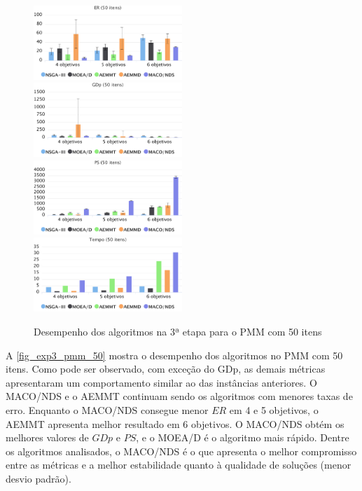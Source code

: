 \begin{figure}[!htbp]
	\includegraphics[width=0.5\textwidth]{cap_experimentos/figs/etapa3/er-mkp-50}
	\includegraphics[width=0.5\textwidth]{cap_experimentos/figs/etapa3/gd-mkp-50}
	\includegraphics[width=0.5\textwidth]{cap_experimentos/figs/etapa3/ps-mkp-50}
	\includegraphics[width=0.5\textwidth]{cap_experimentos/figs/etapa3/time-mkp-50}
	\caption{\label{fig_exp3_pmm_50}Desempenho dos algoritmos na 3ª etapa para o PMM com 50 itens}
\end{figure}

A \autoref{fig_exp3_pmm_50} mostra o desempenho dos algoritmos no PMM com 50 itens. Como pode ser observado, com exceção do GDp, as demais métricas apresentaram um comportamento similar ao das instâncias anteriores. O MACO/NDS e o AEMMT continuam sendo os algoritmos com menores taxas de erro. Enquanto o MACO/NDS consegue menor $ER$ em 4 e 5 objetivos, o AEMMT apresenta melhor resultado em 6 objetivos. O MACO/NDS obtém os melhores valores de $GDp$ e $PS$, e o MOEA/D é o algoritmo mais rápido. Dentre os algoritmos analisados, o MACO/NDS é o que apresenta o melhor compromisso entre as métricas e a melhor estabilidade quanto à qualidade de soluções (menor desvio padrão).

